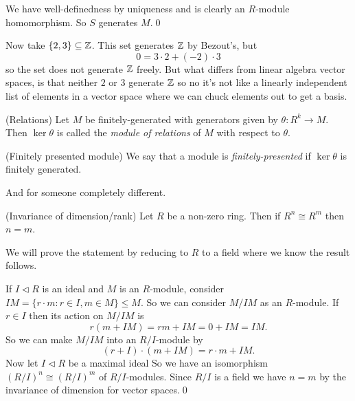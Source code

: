\documentclass{article}
\newcommand{\nrm}{\triangleleft}
\begin{document}
We have well-definedness by uniqueness and is clearly an $ R $-module homomorphism. So $ S $ generates $ M $.\qed
\par
Now take $ \{2,3\}\subseteq \mathbb{Z} $. This set generates $ \mathbb{Z} $ by Bezout's, but
\[
  0=3\cdot 2 + (-2)\cdot 3
\]
so the set does not generate $ \mathbb{Z} $ freely. But what differs from linear algebra vector spaces, is that neither $ 2 $ or $ 3 $ generate $ \mathbb{Z} $ so no it's not like a linearly independent list of elements in a vector space where we can chuck elements out to get a basis.
\begin{definition}
	(Relations) Let $ M $ be finitely-generated with generators given by $\theta: R^k\to M $. Then $ \ker \theta $ is called the \textit{module of relations} of $ M $ with respect to $ \theta $.
\end{definition}
\begin{definition}
	(Finitely presented module) We say that a module is \textit{finitely-presented} if $ \ker\theta $ is finitely generated.
\end{definition}
And for someone completely different.
\begin{proposition}
	(Invariance of dimension/rank) Let $ R $ be a non-zero ring. Then if $ R^n\cong R^m $ then $ n=m $.
\end{proposition}
\pf We will prove the statement by reducing to $ R $ to a field where we know the result follows.\par
If $ I\nrm R $ is an ideal and $ M $ is an $ R $-module, consider $ IM = \{ r\cdot m:r\in I, m\in M\}\le M $. So we can consider $ M/IM $ as an $ R $-module. If $ r\in I $ then its action on $ M/IM $ is
\[
  r(m+IM)=rm+IM=0+IM=IM.
\]
So we can make $ M/IM $ into an $R/I$-module by
\[
	(r+I)\cdot (m+IM)=r\cdot m+IM.
\]
Now let $ I\nrm R $ be a maximal ideal So we have an isomorphism $ (R/I)^n\cong (R/I)^m $ of $ R/I $-modules. Since $ R/I $ is a field we have $ n=m $ by the invariance of dimension for vector spaces.\qed
\end{document}
